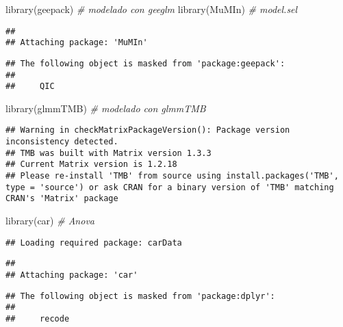 \documentclass[
]{article}
\newenvironment{Shaded}{\begin{snugshade}}{\end{snugshade}}
\newcommand{\CommentTok}[1]{\textcolor[rgb]{0.56,0.35,0.01}{\textit{#1}}}
\newcommand{\FunctionTok}[1]{\textcolor[rgb]{0.00,0.00,0.00}{#1}}
\newcommand{\NormalTok}[1]{#1}
\begin{document}
\begin{Shaded}
\begin{Highlighting}[]
\FunctionTok{library}\NormalTok{(geepack)   }\CommentTok{\# modelado con geeglm}
\FunctionTok{library}\NormalTok{(MuMIn)     }\CommentTok{\# model.sel}
\end{Highlighting}
\end{Shaded}

\begin{verbatim}
## 
## Attaching package: 'MuMIn'
\end{verbatim}

\begin{verbatim}
## The following object is masked from 'package:geepack':
## 
##     QIC
\end{verbatim}

\begin{Shaded}
\begin{Highlighting}[]
\FunctionTok{library}\NormalTok{(glmmTMB)   }\CommentTok{\# modelado con glmmTMB}
\end{Highlighting}
\end{Shaded}

\begin{verbatim}
## Warning in checkMatrixPackageVersion(): Package version inconsistency detected.
## TMB was built with Matrix version 1.3.3
## Current Matrix version is 1.2.18
## Please re-install 'TMB' from source using install.packages('TMB', type = 'source') or ask CRAN for a binary version of 'TMB' matching CRAN's 'Matrix' package
\end{verbatim}

\begin{Shaded}
\begin{Highlighting}[]
\FunctionTok{library}\NormalTok{(car)       }\CommentTok{\# Anova}
\end{Highlighting}
\end{Shaded}

\begin{verbatim}
## Loading required package: carData
\end{verbatim}

\begin{verbatim}
## 
## Attaching package: 'car'
\end{verbatim}

\begin{verbatim}
## The following object is masked from 'package:dplyr':
## 
##     recode
\end{verbatim}
\end{document}

